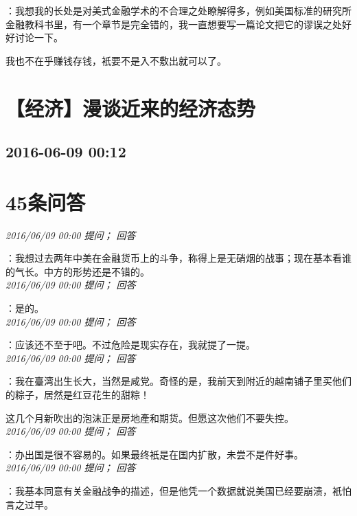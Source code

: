 \documentclass[twocolumn]{ctexart}
\begin{document}
：我想我的长处是对美式金融学术的不合理之处瞭解得多，例如美国标准的研究所金融教科书里，有一个章节是完全错的，我一直想要写一篇论文把它的谬误之处好好讨论一下。

我也不在乎赚钱存钱，衹要不是入不敷出就可以了。\\


\section{【经济】漫谈近来的经济态势}
\subsection{2016-06-09 00:12}


\section{45条问答}

\textit{\hfill\noindent\small 2016/06/09 00:00 提问； 回答}

：我想过去两年中美在金融货币上的斗争，称得上是无硝烟的战事；现在基本看谁的气长。中方的形势还是不错的。\\

\textit{\hfill\noindent\small 2016/06/09 00:00 提问； 回答}

：是的。\\

\textit{\hfill\noindent\small 2016/06/09 00:00 提问； 回答}

：应该还不至于吧。不过危险是现实存在，我就提了一提。\\

\textit{\hfill\noindent\small 2016/06/09 00:00 提问； 回答}

：我在臺湾出生长大，当然是咸党。奇怪的是，我前天到附近的越南铺子里买他们的粽子，居然是红豆花生的甜粽！

这几个月新吹出的泡沫正是房地產和期货。但愿这次他们不要失控。\\

\textit{\hfill\noindent\small 2016/06/09 00:00 提问； 回答}

：办出国是很不容易的。如果最终衹是在国内扩散，未尝不是件好事。\\

\textit{\hfill\noindent\small 2016/06/09 00:00 提问； 回答}

：我基本同意有关金融战争的描述，但是他凭一个数据就说美国已经要崩溃，衹怕言之过早。\\
\end{document}
